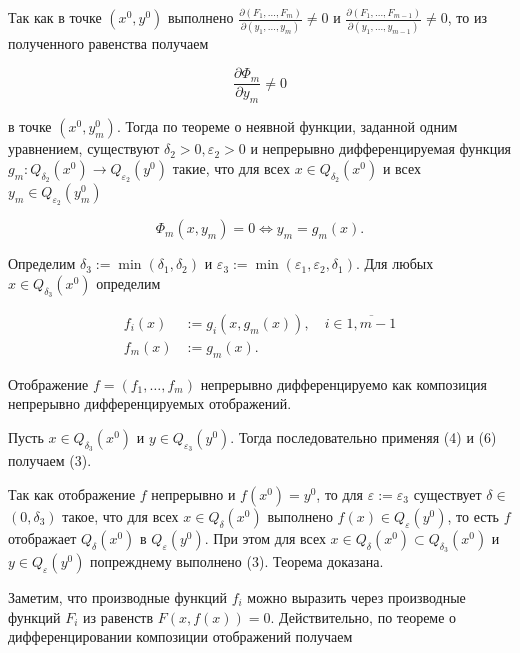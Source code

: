 \documentclass[a4paper,12pt]{article} %
\begin{document}
Так как в точке $\left(x^{0}, y^{0}\right)$ выполнено $\frac{\partial\left(F_{1}, \ldots, F_{m}\right)}{\partial\left(y_{1}, \ldots, y_{m}\right)} \neq 0$ и $\frac{\partial\left(F_{1}, \ldots, F_{m-1}\right)}{\partial\left(y_{1}, \ldots, y_{m-1}\right)} \neq 0$, то из полученного равенства получаем

$$
\frac{\partial \Phi_{m}}{\partial y_{m}} \neq 0
$$

в точке $\left(x^{0}, y_{m}^{0}\right)$. Тогда по теореме о неявной функции, заданной одним уравнением, существуют $\delta_{2}>0, \varepsilon_{2}>0$ и непрерывно дифференцируемая функция $g_{m}: Q_{\delta_{2}}\left(x^{0}\right) \rightarrow Q_{\varepsilon_{2}}\left(y^{0}\right)$ такие, что для всех $x \in Q_{\delta_{2}}\left(x^{0}\right)$ и всех $y_{m} \in Q_{\varepsilon_{2}}\left(y_{m}^{0}\right)$

$$
\Phi_{m}\left(x, y_{m}\right)=0 \Leftrightarrow y_{m}=g_{m}(x) .
$$

Определим $\delta_{3}:=\min \left(\delta_{1}, \delta_{2}\right)$ и $\varepsilon_{3}:=\min \left(\varepsilon_{1}, \varepsilon_{2}, \delta_{1}\right)$. Для любых $x \in Q_{\delta_{3}}\left(x^{0}\right)$ определим

$$
\begin{aligned}
f_{i}(x) & :=g_{i}\left(x, g_{m}(x)\right), \quad i \in \overline{1, m-1} \\
f_{m}(x) & :=g_{m}(x) .
\end{aligned}
$$

Отображение $f=\left(f_{1}, \ldots, f_{m}\right)$ непрерывно дифференцируемо как композиция непрерывно дифференцируемых отображений.

Пусть $x \in Q_{\delta_{3}}\left(x^{0}\right)$ и $y \in Q_{\varepsilon_{3}}\left(y^{0}\right)$. Тогда последовательно применяя (4) и (6) получаем (3).

Так как отображение $f$ непрерывно и $f\left(x^{0}\right)=y^{0}$, то для $\varepsilon:=\varepsilon_{3}$ существует $\delta \in$ $\left(0, \delta_{3}\right)$ такое, что для всех $x \in Q_{\delta}\left(x^{0}\right)$ выполнено $f(x) \in Q_{\varepsilon}\left(y^{0}\right)$, то есть $f$ отображает $Q_{\delta}\left(x^{0}\right)$ в $Q_{\varepsilon}\left(y^{0}\right)$. При этом для всех $x \in Q_{\delta}\left(x^{0}\right) \subset Q_{\delta_{3}}\left(x^{0}\right)$ и $y \in Q_{\varepsilon}\left(y^{0}\right)$ попрежднему выполнено (3). Теорема доказана.

Заметим, что производные функций $f_{i}$ можно выразить через производные функций $F_{i}$ из равенств $F(x, f(x))=0$. Действительно, по теореме о дифференцировании композиции отображений получаем
\end{document}
